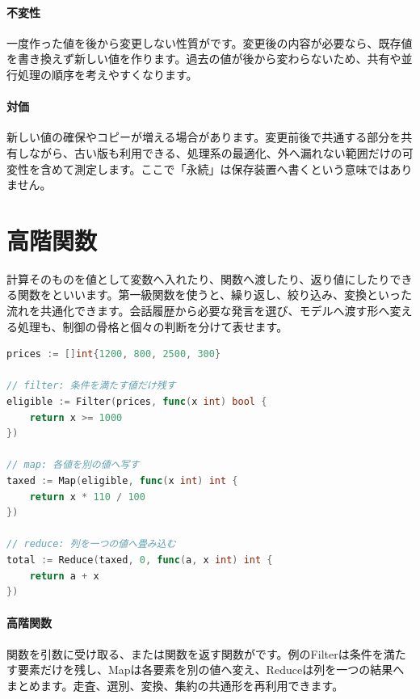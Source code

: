 \par
\endgroup
\medskip
\begingroup
\paragraph{不変性}
        一度作った値を後から変更しない性質がです。変更後の内容が必要なら、既存値を書き換えず新しい値を作ります。過去の値が後から変わらないため、共有や並行処理の順序を考えやすくなります。

\paragraph{対価}
        新しい値の確保やコピーが増える場合があります。変更前後で共通する部分を共有しながら、古い版も利用できる、処理系の最適化、外へ漏れない範囲だけの可変性を含めて測定します。ここで「永続」は保存装置へ書くという意味ではありません。

\par
\endgroup
\par
\endgroup


\section{高階関数}
\label{sec:04-software-engineering-16}

計算そのものを値として変数へ入れたり、関数へ渡したり、返り値にしたりできる関数をといいます。第一級関数を使うと、繰り返し、絞り込み、変換といった流れを共通化できます。会話履歴から必要な発言を選び、モデルへ渡す形へ変える処理も、制御の骨格と個々の判断を分けて表せます。

\begingroup
\begingroup
      \begin{lstlisting}[language=Go]
prices := []int{1200, 800, 2500, 300}

// filter: 条件を満たす値だけ残す
eligible := Filter(prices, func(x int) bool {
    return x >= 1000
})

// map: 各値を別の値へ写す
taxed := Map(eligible, func(x int) int {
    return x * 110 / 100
})

// reduce: 列を一つの値へ畳み込む
total := Reduce(taxed, 0, func(a, x int) int {
    return a + x
})
      \end{lstlisting}
\par
\endgroup
\medskip
\begingroup
\paragraph{高階関数}
        関数を引数に受け取る、または関数を返す関数がです。例のFilterは条件を満たす要素だけを残し、Mapは各要素を別の値へ変え、Reduceは列を一つの結果へまとめます。走査、選別、変換、集約の共通形を再利用できます。

